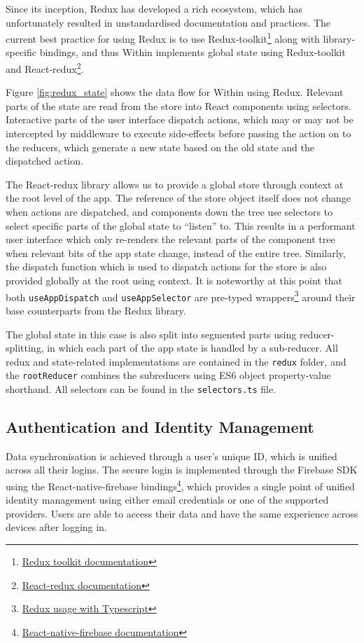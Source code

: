 Since its inception, Redux has developed a rich ecosystem, which has unfortunately resulted in unstandardised documentation and practices. The current best practice for using Redux is to use Redux-toolkit\footnote{\href{https://redux-toolkit.js.org}{Redux toolkit documentation}} along with library-specific bindings, and thus Within implements global state using Redux-toolkit and React-redux\footnote{\href{https://react-redux.js.org}{React-redux documentation}}.

Figure \ref{fig:redux_state} shows the data flow for Within using Redux. Relevant parts of the state are read from the store into React components using selectors. Interactive parts of the user interface dispatch actions, which may or may not be intercepted by middleware to execute side-effects before passing the action on to the reducers, which generate a new state based on the old state and the dispatched action.

The React-redux library allows us to provide a global store through context at the root level of the app. The reference of the store object itself does not change when actions are dispatched, and components down the tree use selectors to select specific parts of the global state to ``listen'' to. This results in a performant user interface which only re-renders the relevant parts of the component tree when relevant bits of the app state change, instead of the entire tree. Similarly, the dispatch function which is used to dispatch actions for the store is also provided globally at the root using context. It is noteworthy at this point that both \texttt{useAppDispatch} and \texttt{useAppSelector} are pre-typed wrappers\footnote{\href{https://redux.js.org/usage/usage-with-typescript}{Redux usage with Typescript}} around their base counterparts from the Redux library.

The global state in this case is also split into segmented parts using reducer-splitting, in which each part of the app state is handled by a sub-reducer. All redux and state-related implementations are contained in the \texttt{redux} folder, and the \texttt{rootReducer} combines the subreducers using ES6 object property-value shorthand. All selectors can be found in the \texttt{selectors.ts} file.


\subsection{Authentication and Identity Management}
Data synchronisation is achieved through a user's unique ID, which is unified across all their logins. The secure login is implemented through the Firebase SDK using the React-native-firebase bindings\footnote{\href{https://rnfirebase.io}{React-native-firebase documentation}}, which provides a single point of unified identity management using either email credentials or one of the supported providers. Users are able to access their data and have the same experience across devices after logging in.

